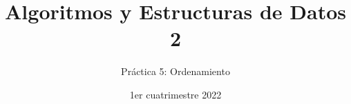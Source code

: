 
\title{Algoritmos y Estructuras de Datos 2}
\author{Práctica 5: Ordenamiento}
\date{1er cuatrimestre 2022}



\maketitle
\tableofcontents
\newpage




















